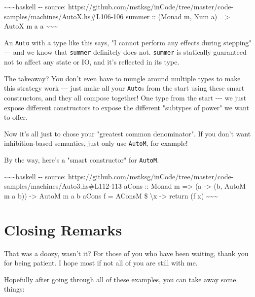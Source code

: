 \documentclass[]{article}
\begin{document}
\textasciitilde{}\textasciitilde{}\textasciitilde{}haskell -\/- source:
https://github.com/mstksg/inCode/tree/master/code-samples/machines/AutoX.hs\#L106-106
summer :: (Monad m, Num a) =\textgreater{} AutoX m a a
\textasciitilde{}\textasciitilde{}\textasciitilde{}

An \texttt{Auto} with a type like this says, "I cannot perform any effects
during stepping" -\/-\/- and we know that \texttt{summer} definitely does not.
\texttt{summer} is statically guaranteed not to affect any state or IO, and it's
reflected in its type.

The takeaway? You don't even have to mungle around multiple types to make this
strategy work -\/-\/- just make all your \texttt{Auto}s from the start using
these smart constructors, and they all compose together! One type from the start
-\/-\/- we just expose different constructors to expose the different "subtypes
of power" we want to offer.

Now it's all just to chose your "greatest common denominator". If you don't want
inhibition-based semantics, just only use \texttt{AutoM}, for example!

By the way, here's a "smart constructor" for \texttt{AutoM}.

\textasciitilde{}\textasciitilde{}\textasciitilde{}haskell -\/- source:
https://github.com/mstksg/inCode/tree/master/code-samples/machines/Auto3.hs\#L112-113
aCons :: Monad m =\textgreater{} (a -\textgreater{} (b, AutoM m a b))
-\textgreater{} AutoM m a b aCons f = AConsM \$ \textbackslash{}x
-\textgreater{} return (f x) \textasciitilde{}\textasciitilde{}\textasciitilde{}

\section{Closing Remarks}

That was a doozy, wasn't it? For those of you who have been waiting, thank you
for being patient. I hope most if not all of you are still with me.

Hopefully after going through all of these examples, you can take away some
things:
\end{document}
